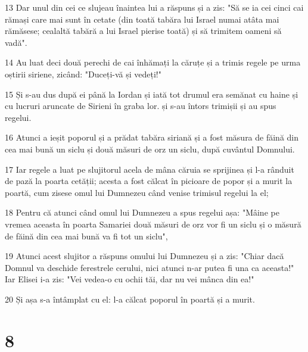 \par 13 Dar unul din cei ce slujeau înaintea lui a răspuns și a zis: "Să se ia cei cinci cai rămași care mai sunt în cetate (din toată tabăra lui Israel numai atâta mai rămăsese; cealaltă tabără a lui Israel pierise toată) și să trimitem oameni să vadă".
\par 14 Au luat deci două perechi de cai înhămați la căruțe și a trimis regele pe urma oștirii siriene, zicând: "Duceți-vă și vedeți!"
\par 15 Și s-au dus după ei până la Iordan și iată tot drumul era semănat cu haine și cu lucruri aruncate de Sirieni în graba lor. și s-au întors trimișii și au spus regelui.
\par 16 Atunci a ieșit poporul și a prădat tabăra siriană și a fost măsura de făină din cea mai bună un siclu și două măsuri de orz un siclu, după cuvântul Domnului.
\par 17 Iar regele a luat pe slujitorul acela de mâna căruia se sprijinea și l-a rânduit de pază la poarta cetății; acesta a fost călcat în picioare de popor și a murit la poartă, cum zisese omul lui Dumnezeu când venise trimisul regelui la el;
\par 18 Pentru că atunci când omul lui Dumnezeu a spus regelui așa: "Mâine pe vremea aceasta în poarta Samariei două măsuri de orz vor fi un siclu și o măsură de făină din cea mai bună va fi tot un siclu",
\par 19 Atunci acest slujitor a răspuns omului lui Dumnezeu și a zis: "Chiar dacă Domnul va deschide ferestrele cerului, nici atunci n-ar putea fi una ca aceasta!" Iar Elisei i-a zis: "Vei vedea-o cu ochii tăi, dar nu vei mânca din ea!"
\par 20 Și așa s-a întâmplat cu el: l-a călcat poporul în poartă și a murit.

\chapter{8}

